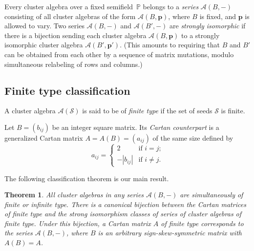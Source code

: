\documentclass[letterpaper]{amsart}
\numberwithin{equation}{section}
\newtheorem{theorem}{Theorem}[section]
\theoremstyle{definition}
\newtheorem{definition}[theorem]{Definition}
\def\AA{\mathcal{A}}
\def\PP{\mathbb{P}}
\def\pp{\mathbf{p}}
\begin{document}
 
Every cluster algebra over a fixed semifield~$\PP$ belongs to a 
\emph{series} $\AA(B,-)$ consisting of all 
cluster algebras of the form $\AA(B,\pp)$, where $B$ is fixed, and 
$\pp$ is allowed to vary. 
Two series $\AA(B,-)$ and $\AA(B',-)$ are 
\emph{strongly isomorphic} if there is a bijection sending each 
cluster algebra $\AA(B,\pp)$ to a strongly isomorphic cluster 
algebra $\AA(B',\pp')$. (This amounts to requiring that $B$ and 
$B'$ can be obtained from each other by a sequence of matrix 
mutations, modulo simultaneous relabeling of rows and columns.) 
 
\subsection{Finite type classification} 
\label{sec:finite-type-classification} 
A cluster algebra $\AA(\mathcal{S})$ is said to be of \emph{finite 
type} if the set of seeds $\mathcal{S}$ 
is finite. 
 
 
 
 
Let  $B=(b_{ij})$  be an integer square matrix. 
Its \emph{Cartan counterpart} is a generalized Cartan matrix $A = 
A(B)=(a_{ij})$ of the same size defined by 
\begin{equation} 
\label{eq:assoc-cartan} a_{ij} = 
\begin{cases} 
2 & \text{if $i=j$;} \\ %
- |b_{ij}| & \text{if $i\neq j$.} 
\end{cases} 
\end{equation} 
 
The following classification theorem is our main result. 
 
\begin{theorem} 
\label{th:fin-type-class} 
All cluster algebras in any series $\AA(B,-)$ 
are simultaneously of finite or infinite type. 
There is a canonical bijection between the Cartan matrices of finite 
type and the strong isomorphism classes of 
series of cluster algebras of finite type. 
Under this bijection, a Cartan matrix $A$ of finite type 
corresponds to the series $\AA(B,-)$, where $B$ is an arbitrary 
sign-skew-symmetric matrix with $A(B)=A$. 
\end{theorem} 
 
\end{document}
